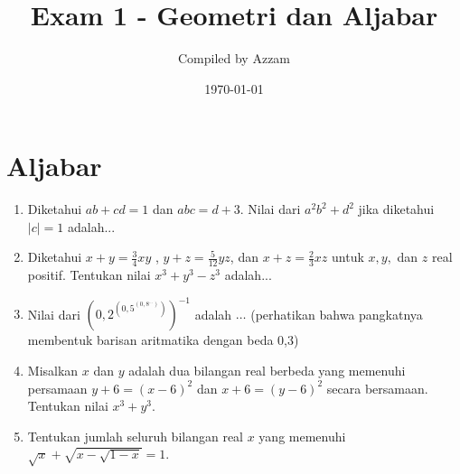 \documentclass[11pt]{scrartcl}
\title{Exam 1 - Geometri dan Aljabar} %
\date{\today}
\author{Compiled by Azzam}
\begin{document}
\maketitle
\section{Aljabar}
\begin{enumerate}
      \item
		Diketahui $ab+cd=1$ dan $abc=d+3$. Nilai dari $a^2b^2+d^2$ jika diketahui $|c|=1$ adalah...


	\item
		Diketahui $x+y=\frac34 xy$ , $y+z=\frac{5}{12}yz$, dan $x+z=\frac23xz$ untuk $x,y,$ dan $z$ real positif. Tentukan nilai $x^3+y^3-z^3$ adalah...


		\item Nilai dari $\left(0,2 ^{\left(0,5 ^{\left(0,8 ^{...} \right)} \right)} \right)^{-1}$ adalah $\dots$ (perhatikan bahwa pangkatnya membentuk barisan aritmatika dengan beda 0,3)

    \item
		Misalkan $x$ dan $y$ adalah dua bilangan real berbeda yang memenuhi persamaan $y+6 = (x-6)^2$ dan $x+6 = (y-6)^2$ secara bersamaan. Tentukan nilai $x^3+y^3$.

		\item Tentukan jumlah seluruh bilangan real $x$ yang memenuhi $\sqrt{x}+\sqrt{x-\sqrt{1-x}}=1$.
\end{enumerate}

\
\end{document}
